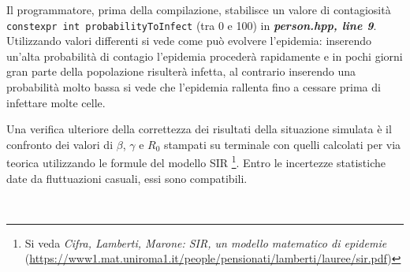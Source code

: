 \documentclass[a4paper,10 pt]{article}
\begin{document}
Il programmatore, prima della compilazione, stabilisce un valore di contagiosità \verb!constexpr int probabilityToInfect! (tra 0 e 100) in \textbf{\textit{person.hpp, line 9}}. Utilizzando valori differenti si vede come può evolvere l'epidemia: inserendo un'alta probabilità di contagio l'epidemia procederà rapidamente e in pochi giorni gran parte della popolazione risulterà infetta, al contrario inserendo una probabilità molto bassa si vede che l'epidemia rallenta fino a cessare prima di infettare molte celle.


Una verifica ulteriore della correttezza dei risultati della situazione simulata è il confronto dei valori di $\beta$, $\gamma$ e $R_0$ stampati su terminale con quelli calcolati per via teorica utilizzando le formule del modello SIR \footnote{Si veda \textit{Cifra, Lamberti, Marone: SIR, un modello matematico di epidemie} (\url{https://www1.mat.uniroma1.it/people/pensionati/lamberti/lauree/sir.pdf})}. Entro le incertezze statistiche date da fluttuazioni casuali, essi sono compatibili.

\begin{figure}[h]
\centering
{} \quad {} \\
\caption{}
\label{fig:subfig}
\end{figure}
\end{document}
